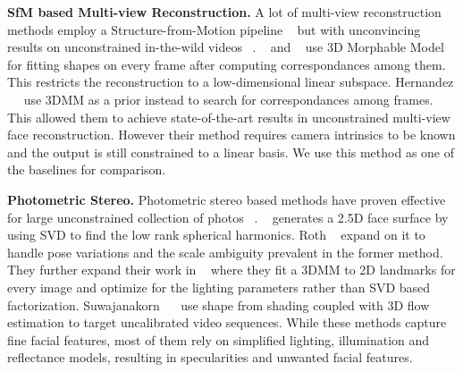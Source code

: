 \documentclass[10pt,twocolumn,letterpaper]{article}
\begin{document}
\noindent \textbf{SfM based Multi-view Reconstruction.} A lot of multi-view reconstruction methods employ a Structure-from-Motion pipeline ~\cite{gotardo2015photogeometric, lin2010accurate, fidaleo2007model} but with unconvincing results on unconstrained in-the-wild videos ~\cite{hernandez2017accurate}. ~\cite{brand2001morphable} and ~\cite{shi2014automatic} use 3D Morphable Model~\cite{blanz1999morphable} for fitting shapes on every frame after computing correspondances among them. This restricts the reconstruction to a low-dimensional linear subspace. Hernandez ~\etal ~\cite{hernandez2017accurate} use 3DMM as a prior instead to search for correspondances among frames. This allowed them to achieve state-of-the-art results in unconstrained multi-view face reconstruction. However their method requires camera intrinsics to be known and the output is still constrained to a linear basis. We use this method as one of the baselines for comparison.

\noindent \textbf{Photometric Stereo.} Photometric stereo based methods have proven effective for large unconstrained collection of photos ~\cite{kemelmacher2011face, kemelmacher2013internet, roth2015unconstrained}. ~\cite{kemelmacher2011face} generates a 2.5D face surface by using SVD to find the low rank spherical harmonics. Roth \etal ~\cite{roth2015unconstrained} expand on it to handle pose variations and the scale ambiguity prevalent in the former method. They further expand their work in ~\cite{roth2016adaptive} where they fit a 3DMM to 2D landmarks for every image and optimize for the lighting parameters rather than SVD based factorization. Suwajanakorn ~\etal ~\cite{suwajanakorn2014total} use shape from shading coupled with 3D flow estimation to target uncalibrated video sequences. While these methods capture fine facial features, most of them rely on simplified lighting, illumination and reflectance models, resulting in specularities and unwanted facial features.
\end{document}
